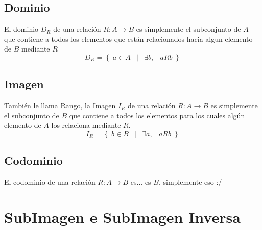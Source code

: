 \documentclass[12pt, fleqn]{report}                             %
\DeclareMathOperator \Space     {\quad}                         %
\DeclareMathOperator \MiniSpace {\;}                            %
\newcommand \Such           {\MiniSpace | \MiniSpace}           %
\theoremstyle{break}                                            %
\newcommand{\Set}[1]            {\left\{ \; #1 \; \right\}}     %
\begin{document}
            \subsection*{Dominio}

                El dominio $D_R$ de una relación $R : A \to B$ es simplemente el subconjunto de $A$ que
                contiene a todos los elementos que están relacionados hacia algun elemento de $B$ mediante $R$
                \begin{equation*}
                    D_R = \Set{ a \in A \Such \exists b, \MiniSpace aRb }
                \end{equation*}

            \subsection*{Imagen}

                También le llama Rango, la Imagen $I_R$ de una relación $R : A \to B$
                es simplemente el subconjunto de $B$ que contiene a todos los elementos
                para los cuales algún elemento de $A$ los relaciona mediante $R$.
                \begin{equation*}
                    I_R = \Set{ b \in B \Such \exists a, \MiniSpace aRb }
                \end{equation*}

            \subsection*{Codominio}

                El codominio de una relación $R: A \to B$ es... es $B$, simplemente eso :/


        \clearpage
        \section{SubImagen e SubImagen Inversa}
\end{document}
